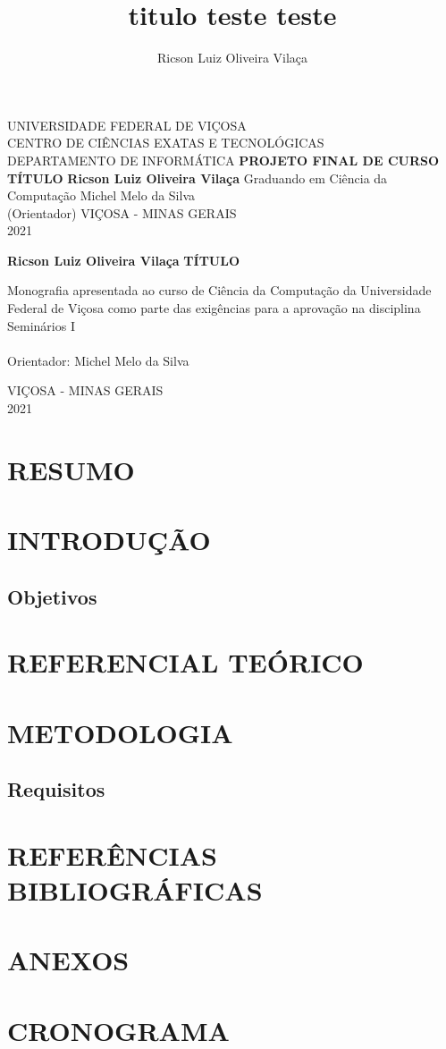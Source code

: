 \documentclass[12pt,a4paper]{article}
\author{Ricson Luiz Oliveira Vilaça}
\title{titulo teste teste}
\begin{document}
	
	\begin{center}
			\thispagestyle{empty}
			UNIVERSIDADE FEDERAL DE VIÇOSA\\
			CENTRO DE CIÊNCIAS EXATAS E TECNOLÓGICAS\\
			DEPARTAMENTO DE INFORMÁTICA
			\vfill
			{\large \textbf{PROJETO FINAL DE CURSO}}
			\vfill
			{\Large \textbf{TÍTULO}}
			\vfill
			\textbf{Ricson Luiz Oliveira Vilaça} \hfill Graduando em Ciência da Computação
			\vfill
			Michel Melo da Silva\\
			(Orientador)
			\vfill
			VIÇOSA - MINAS GERAIS\\
			2021
		
		\newpage
			\thispagestyle{empty}
			\textbf{Ricson Luiz Oliveira Vilaça}
			\vfill
			{\Large \textbf{TÍTULO}}
			\vfill
			\begin{flushright}
				\begin{minipage}{.5\textwidth}
					Monografia apresentada ao curso de Ciência da Computação da Universidade Federal de Viçosa como parte das exigências para a aprovação na disciplina Seminários I\\\\
					Orientador: Michel Melo da Silva
				\end{minipage}
			\end{flushright}
			\vfill
			VIÇOSA - MINAS GERAIS\\
			2021
	\end{center}
	
		\newpage
			\thispagestyle{empty}
			\tableofcontents
		
		\newpage
			\section*{RESUMO}
			
		\newpage
			\section{INTRODUÇÃO}
			\subsection{Objetivos}
			
		\newpage
			\section{REFERENCIAL TEÓRICO}
		
		\newpage
			\section{METODOLOGIA}
			\subsection{Requisitos}
		
		\newpage
			\section{REFERÊNCIAS BIBLIOGRÁFICAS}
			
		\newpage
			\section{ANEXOS}
			
		\newpage
			\section{CRONOGRAMA}
	
\end{document}
